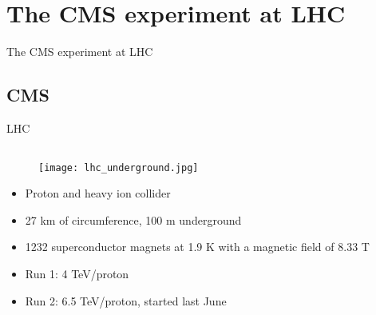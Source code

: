 \section[CMS]{The CMS experiment at LHC}
\setcounter{tocdepth}{2}

\begin{frame}{}
The CMS experiment at LHC
\end{frame}

\subsection{CMS}

\begin{frame}{LHC}
\vspace{-.2cm}

\begin{columns}
\begin{column}{.50\textwidth}
\begin{figure}[!Hhtbp]
  \begin{center}
    \texttt{[image: lhc\_underground.jpg]}
  \end{center}
\end{figure}
\vspace{-.2cm}
\begin{block}{}
\begin{itemize}\scriptsize
\item Proton and heavy ion collider
\item 27 km of circumference, 100 m underground
\item 1232 superconductor magnets at 1.9 K with a magnetic field of 8.33 T
\item Run 1: 4 TeV/proton
\item Run 2: 6.5 TeV/proton, started last June
\end{itemize}
\end{block}
\end{column}


\end{columns}
\end{frame}
